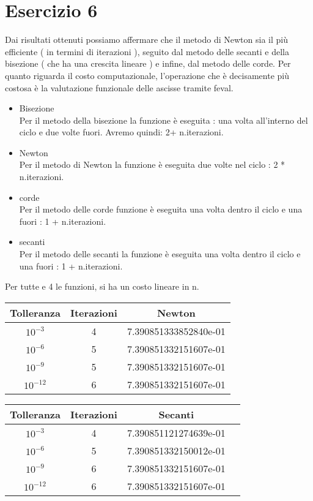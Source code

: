 
\section{Esercizio 6}
Dai risultati ottenuti possiamo affermare che il metodo di Newton sia il più efficiente ( in termini di iterazioni ), seguito dal metodo delle secanti e della bisezione ( che ha una crescita lineare ) e infine, dal metodo delle corde. Per quanto riguarda il costo computazionale, l'operazione che è decisamente più costosa è la valutazione funzionale delle ascisse tramite feval.\
\begin{itemize}
\item Bisezione\\
Per il metodo della bisezione la funzione è eseguita : una volta all'interno del ciclo e due volte fuori. Avremo quindi: 2+ n.iterazioni.
\item Newton \\
Per il metodo di Newton la funzione è eseguita due volte nel ciclo : 2 * n.iterazioni.
\item corde \\
Per il metodo delle corde funzione è eseguita una volta dentro il ciclo e una fuori : 1 + n.iterazioni.
\item secanti\\
Per il metodo delle secanti la funzione è eseguita una volta dentro il ciclo e una fuori : 1 + n.iterazioni.
\end{itemize}
Per tutte e 4 le funzioni, si ha un costo lineare in n.

\begin{table}[ht!]
	\centering
	\small
	\begin{tabular}{| c | c | c | }
	\hline
	Tolleranza & Iterazioni & Newton\\
	\hline
	 $10^{-3}$ & 4 & 7.390851333852840e-01\\
	\hline
	$10^{-6}$  & 5 & 7.390851332151607e-01\\
	\hline
	$10^{-9}$  &  5& 7.390851332151607e-01\\
	\hline
	$10^{-12}$ & 6 & 7.390851332151607e-01\\
	\hline
	\end{tabular}
\end{table}

\begin{table}[ht!]
	\centering
	\small
	\begin{tabular}{| c | c | c | c |}
	\hline
	Tolleranza & Iterazioni & Secanti\\
	\hline
	 $10^{-3}$ & 4 & 7.390851121274639e-01\\
	\hline
	$10^{-6}$ & 5 & 7.390851332150012e-01\\
	\hline
	$10^{-9}$ & 6 & 7.390851332151607e-01\\
	\hline
	$10^{-12}$ & 6 & 7.390851332151607e-01\\
	\hline
	\end{tabular}
\end{table}

